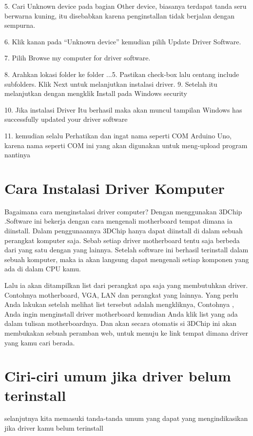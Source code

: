 5. Cari Unknown device pada bagian Other device, biasanya terdapat tanda seru berwarna kuning, itu disebabkan karena penginstallan tidak berjalan dengan sempurna.

6. Klik kanan pada “Unknown device” kemudian pilih Update Driver Software.

7. Pilih Browse my computer for driver software.

8. Arahkan lokasi folder ke folder ...5\drivers. Pastikan check-box lalu centang include subfolders. Klik Next untuk melanjutkan instalasi driver.
9. Setelah itu melanjutkan dengan mengklik Install pada Windows security

10. Jika instalasi Driver Itu berhasil maka akan muncul tampilan Windows has successfully updated your driver software

11. kemudian selalu Perhatikan dan ingat nama seperti COM Arduino Uno, karena nama  seperti COM ini yang akan  digunakan untuk meng-upload program nantinya

\section {Cara Instalasi Driver Komputer}
Bagaimana cara menginstalasi driver computer? 
Dengan menggunakan 3DChip .Software ini bekerja dengan cara mengenali motherboard tempat dimana ia diinstall. Dalam penggunaannya 3DChip hanya dapat diinstall di dalam sebuah perangkat komputer saja. Sebab setiap driver motherboard tentu saja berbeda dari  yang satu dengan yang lainnya. Setelah software ini berhasil terinstall dalam sebuah komputer, maka ia akan langsung dapat mengenali setiap komponen yang ada di dalam CPU kamu. 

Lalu ia akan ditampilkan list dari perangkat apa saja yang membutuhkan driver. Contohnya motherboard, VGA, LAN dan perangkat yang lainnya. Yang perlu Anda lakukan setelah melihat list tersebut adalah mengkliknya, Contohnya , Anda ingin menginstall driver motherboard kemudian Anda klik  list yang ada  dalam tulisan motherboardnya. Dan akan secara otomatis si 3DChip ini akan membukakan sebuah peramban web, untuk menuju ke link tempat dimana driver yang kamu cari berada.


\section {Ciri-ciri umum jika driver belum terinstall}
selanjutnya kita memasuki tanda-tanda umum yang dapat yang mengindikasikan jika driver kamu belum terinstall

